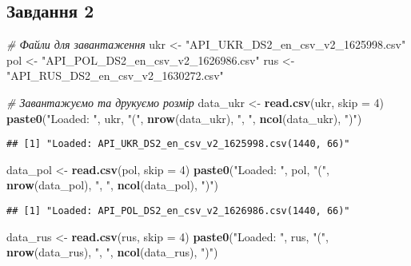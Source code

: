 \documentclass[
]{article}
\newenvironment{Shaded}{\begin{snugshade}}{\end{snugshade}}
\newcommand{\CommentTok}[1]{\textcolor[rgb]{0.56,0.35,0.01}{\textit{#1}}}
\newcommand{\DataTypeTok}[1]{\textcolor[rgb]{0.13,0.29,0.53}{#1}}
\newcommand{\DecValTok}[1]{\textcolor[rgb]{0.00,0.00,0.81}{#1}}
\newcommand{\KeywordTok}[1]{\textcolor[rgb]{0.13,0.29,0.53}{\textbf{#1}}}
\newcommand{\NormalTok}[1]{#1}
\newcommand{\StringTok}[1]{\textcolor[rgb]{0.31,0.60,0.02}{#1}}
\begin{document}
\hypertarget{ux437ux430ux432ux434ux430ux43dux43dux44f-2}{%
\subsection{Завдання
2}\label{ux437ux430ux432ux434ux430ux43dux43dux44f-2}}

\begin{Shaded}
\begin{Highlighting}[]
\CommentTok{# Файли для завантаження}
\NormalTok{ukr <-}\StringTok{ "API_UKR_DS2_en_csv_v2_1625998.csv"}
\NormalTok{pol <-}\StringTok{ "API_POL_DS2_en_csv_v2_1626986.csv"}
\NormalTok{rus <-}\StringTok{ "API_RUS_DS2_en_csv_v2_1630272.csv"}

\CommentTok{# Завантажуємо та друкуємо розмір}
\NormalTok{data_ukr <-}\StringTok{ }\KeywordTok{read.csv}\NormalTok{(ukr, }\DataTypeTok{skip =} \DecValTok{4}\NormalTok{)}
\KeywordTok{paste0}\NormalTok{(}\StringTok{"Loaded: "}\NormalTok{, ukr, }\StringTok{"("}\NormalTok{, }\KeywordTok{nrow}\NormalTok{(data_ukr), }\StringTok{", "}\NormalTok{, }\KeywordTok{ncol}\NormalTok{(data_ukr), }\StringTok{")"}\NormalTok{)}
\end{Highlighting}
\end{Shaded}

\begin{verbatim}
## [1] "Loaded: API_UKR_DS2_en_csv_v2_1625998.csv(1440, 66)"
\end{verbatim}

\begin{Shaded}
\begin{Highlighting}[]
\NormalTok{data_pol <-}\StringTok{ }\KeywordTok{read.csv}\NormalTok{(pol, }\DataTypeTok{skip =} \DecValTok{4}\NormalTok{)}
\KeywordTok{paste0}\NormalTok{(}\StringTok{"Loaded: "}\NormalTok{, pol, }\StringTok{"("}\NormalTok{, }\KeywordTok{nrow}\NormalTok{(data_pol), }\StringTok{", "}\NormalTok{, }\KeywordTok{ncol}\NormalTok{(data_pol), }\StringTok{")"}\NormalTok{)}
\end{Highlighting}
\end{Shaded}

\begin{verbatim}
## [1] "Loaded: API_POL_DS2_en_csv_v2_1626986.csv(1440, 66)"
\end{verbatim}

\begin{Shaded}
\begin{Highlighting}[]
\NormalTok{data_rus <-}\StringTok{ }\KeywordTok{read.csv}\NormalTok{(rus, }\DataTypeTok{skip =} \DecValTok{4}\NormalTok{)}
\KeywordTok{paste0}\NormalTok{(}\StringTok{"Loaded: "}\NormalTok{, rus, }\StringTok{"("}\NormalTok{, }\KeywordTok{nrow}\NormalTok{(data_rus), }\StringTok{", "}\NormalTok{, }\KeywordTok{ncol}\NormalTok{(data_rus), }\StringTok{")"}\NormalTok{)}
\end{Highlighting}
\end{Shaded}
\end{document}
